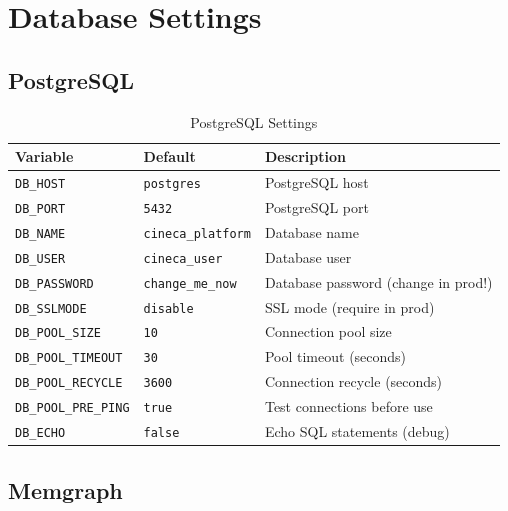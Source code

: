 \section{Database Settings}
\label{app:config:database}

\subsection{PostgreSQL}

\begin{table}[ht]
\centering
\caption{PostgreSQL Settings}
\label{tab:config-postgres}
\small
\begin{tabularx}{\textwidth}{llX}
    \hline
    \textbf{Variable} & \textbf{Default} & \textbf{Description} \\
    \hline
    \texttt{DB\_HOST} & \texttt{postgres} & PostgreSQL host \\
    \texttt{DB\_PORT} & \texttt{5432} & PostgreSQL port \\
    \texttt{DB\_NAME} & \texttt{cineca\_platform} & Database name \\
    \texttt{DB\_USER} & \texttt{cineca\_user} & Database user \\
    \texttt{DB\_PASSWORD} & \texttt{change\_me\_now} & Database password (change in prod!) \\
    \texttt{DB\_SSLMODE} & \texttt{disable} & SSL mode (require in prod) \\
    \texttt{DB\_POOL\_SIZE} & \texttt{10} & Connection pool size \\
    \texttt{DB\_POOL\_TIMEOUT} & \texttt{30} & Pool timeout (seconds) \\
    \texttt{DB\_POOL\_RECYCLE} & \texttt{3600} & Connection recycle (seconds) \\
    \texttt{DB\_POOL\_PRE\_PING} & \texttt{true} & Test connections before use \\
    \texttt{DB\_ECHO} & \texttt{false} & Echo SQL statements (debug) \\
    \hline
\end{tabularx}
\end{table}

\subsection{Memgraph}

